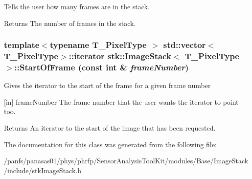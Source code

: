 \label{classstk_1_1ImageStack_af3e54a635f493de7f33e492ccb74372c}
Tells the user how many frames are in the stack. \begin{DoxyReturn}{Returns}
The number of frames in the stack. 
\end{DoxyReturn}
\hypertarget{classstk_1_1ImageStack_af971ec074b7d371d9e44672f5cc6626c}{
\subsubsection[{StartOfFrame}]{\setlength{\rightskip}{0pt plus 5cm}template$<$typename T\_\-PixelType $>$ std::vector$<$T\_\-PixelType$>$::iterator {\bf stk::ImageStack}$<$ T\_\-PixelType $>$::StartOfFrame (const int \& {\em frameNumber})}}
\label{classstk_1_1ImageStack_af971ec074b7d371d9e44672f5cc6626c}
Gives the iterator to the start of the frame for a given frame number \begin{DoxyParagraph}{\mbox{[}in\mbox{]} frameNumber The frame number that the user wants the iterator to point too.}

\end{DoxyParagraph}
\begin{DoxyReturn}{Returns}
An iterator to the start of the image that has been requested. 
\end{DoxyReturn}


The documentation for this class was generated from the following file:\begin{DoxyCompactItemize}
\item 
/panfs/panasas01/phys/phrfp/SensorAnalysisToolKit/modules/Base/ImageStack/include/stkImageStack.h\end{DoxyCompactItemize}
